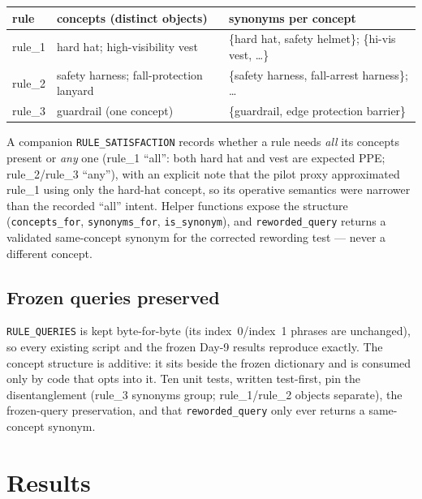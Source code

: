 \begin{center}
\begin{tabular}{p{2.0cm}p{5.5cm}p{5.0cm}}
\toprule
\textbf{rule} & \textbf{concepts (distinct objects)} & \textbf{synonyms per concept} \\
\midrule
rule\_1 & hard hat; high-visibility vest & \{hard hat, safety helmet\}; \{hi-vis vest, \ldots\} \\
rule\_2 & safety harness; fall-protection lanyard & \{safety harness, fall-arrest harness\}; \ldots \\
rule\_3 & guardrail (one concept) & \{guardrail, edge protection barrier\} \\
\bottomrule
\end{tabular}
\label{tab:p15-concepts}
\end{center}

A companion \texttt{RULE\_SATISFACTION} records whether a rule needs \emph{all} its concepts present or
\emph{any} one (rule\_1 ``all'': both hard hat and vest are expected PPE; rule\_2/rule\_3 ``any''),
with an explicit note that the pilot proxy approximated rule\_1 using only the hard-hat concept, so its
operative semantics were narrower than the recorded ``all'' intent. Helper functions expose the
structure (\texttt{concepts\_for}, \texttt{synonyms\_for}, \texttt{is\_synonym}), and
\texttt{reworded\_query} returns a validated same-concept synonym for the corrected rewording test ---
never a different concept.

\subsection{Frozen queries preserved}

\texttt{RULE\_QUERIES} is kept byte-for-byte (its index~0/index~1 phrases are unchanged), so every
existing script and the frozen Day-9 results reproduce exactly. The concept structure is additive: it
sits beside the frozen dictionary and is consumed only by code that opts into it. Ten unit tests,
written test-first, pin the disentanglement (rule\_3 synonyms group; rule\_1/rule\_2 objects
separate), the frozen-query preservation, and that \texttt{reworded\_query} only ever returns a
same-concept synonym.

\section{Results}

